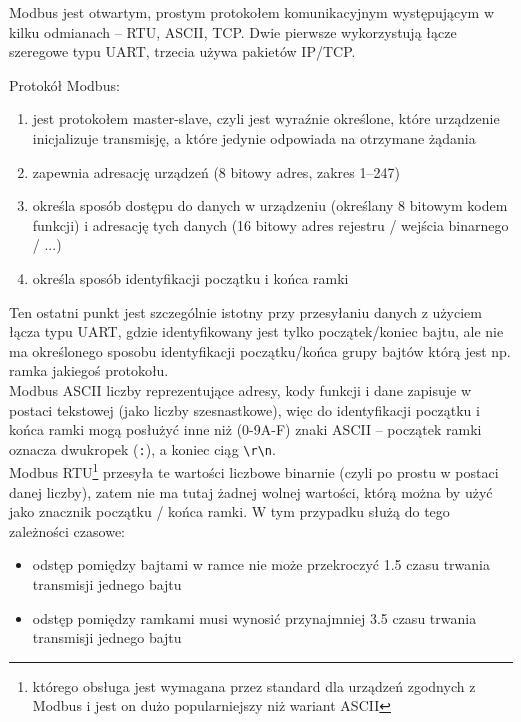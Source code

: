 
Modbus jest otwartym, prostym protokołem komunikacyjnym występującym w kilku odmianach – RTU, ASCII, TCP.
Dwie pierwsze wykorzystują łącze szeregowe typu UART, trzecia używa pakietów IP/TCP.

\noindent
Protokół Modbus:
\begin{enumerate}
	\item jest protokołem master-slave, czyli jest wyraźnie określone, które urządzenie inicjalizuje transmisję, a które jedynie odpowiada na otrzymane żądania
	\item zapewnia adresację urządzeń (8 bitowy adres, zakres 1–247)
	\item określa sposób dostępu do danych w urządzeniu (określany 8 bitowym kodem funkcji) i adresację tych danych (16 bitowy adres rejestru / wejścia binarnego / ...)
	\item określa sposób identyfikacji początku i końca ramki
\end{enumerate}

Ten ostatni punkt jest szczególnie istotny przy przesyłaniu danych z użyciem łącza typu UART, gdzie identyfikowany jest tylko początek/koniec bajtu, ale nie ma określonego sposobu identyfikacji początku/końca grupy bajtów którą jest np. ramka jakiegoś protokołu.
\vspace{7pt}
\\
Modbus ASCII liczby reprezentujące adresy, kody funkcji i dane zapisuje w postaci tekstowej (jako liczby szesnastkowe), więc do identyfikacji początku i końca ramki mogą posłużyć inne niż (0-9A-F) znaki ASCII – początek ramki oznacza dwukropek (\Verb$:$), a koniec ciąg \Verb$\r\n$.
\vspace{3pt}
\\
Modbus RTU\footnote{którego obsługa jest wymagana przez standard dla urządzeń zgodnych z Modbus i jest on dużo popularniejszy niż wariant ASCII} przesyła te wartości liczbowe binarnie (czyli po prostu w postaci danej liczby), zatem nie ma tutaj żadnej wolnej wartości, którą można by użyć jako znacznik początku / końca ramki. W tym przypadku służą do tego zależności czasowe:
\begin{itemize}
	\item odstęp pomiędzy bajtami w ramce nie może przekroczyć 1.5 czasu trwania transmisji jednego bajtu
	\item odstęp pomiędzy ramkami musi wynosić przynajmniej 3.5 czasu trwania transmisji jednego bajtu
\end{itemize}

